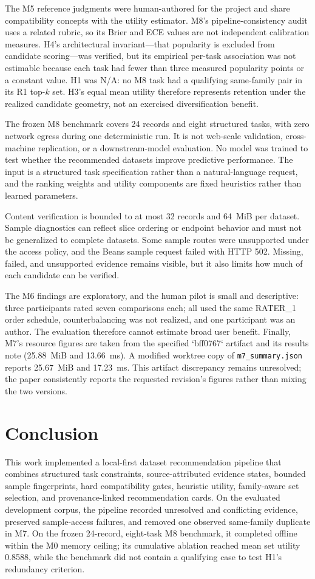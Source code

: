 \documentclass[conference]{IEEEtran}
\begin{document}
The M5 reference judgments were human-authored for the project and share compatibility concepts with the utility estimator. M8's pipeline-consistency audit uses a related rubric, so its Brier and ECE values are not independent calibration measures. H4's architectural invariant—that popularity is excluded from candidate scoring—was verified, but its empirical per-task association was not estimable because each task had fewer than three measured popularity points or a constant value. H1 was N/A: no M8 task had a qualifying same-family pair in its R1 top-$k$ set. H3's equal mean utility therefore represents retention under the realized candidate geometry, not an exercised diversification benefit.

The frozen M8 benchmark covers 24 records and eight structured tasks, with zero network egress during one deterministic run. It is not web-scale validation, cross-machine replication, or a downstream-model evaluation. No model was trained to test whether the recommended datasets improve predictive performance. The input is a structured task specification rather than a natural-language request, and the ranking weights and utility components are fixed heuristics rather than learned parameters.

Content verification is bounded to at most 32 records and 64~MiB per dataset. Sample diagnostics can reflect slice ordering or endpoint behavior and must not be generalized to complete datasets. Some sample routes were unsupported under the access policy, and the Beans sample request failed with HTTP 502. Missing, failed, and unsupported evidence remains visible, but it also limits how much of each candidate can be verified.

The M6 findings are exploratory, and the human pilot is small and descriptive: three participants rated seven comparisons each; all used the same RATER\_1 order schedule, counterbalancing was not realized, and one participant was an author. The evaluation therefore cannot estimate broad user benefit. Finally, M7's resource figures are taken from the specified `bff0767` artifact and its results note (25.88~MiB and 13.66~ms). A modified worktree copy of \texttt{m7\_summary.json} reports 25.67~MiB and 17.23~ms. This artifact discrepancy remains unresolved; the paper consistently reports the requested revision's figures rather than mixing the two versions.

\section{Conclusion}
This work implemented a local-first dataset recommendation pipeline that combines structured task constraints, source-attributed evidence states, bounded sample fingerprints, hard compatibility gates, heuristic utility, family-aware set selection, and provenance-linked recommendation cards. On the evaluated development corpus, the pipeline recorded unresolved and conflicting evidence, preserved sample-access failures, and removed one observed same-family duplicate in M7. On the frozen 24-record, eight-task M8 benchmark, it completed offline within the M0 memory ceiling; its cumulative ablation reached mean set utility 0.8588, while the benchmark did not contain a qualifying case to test H1's redundancy criterion.
\end{document}
